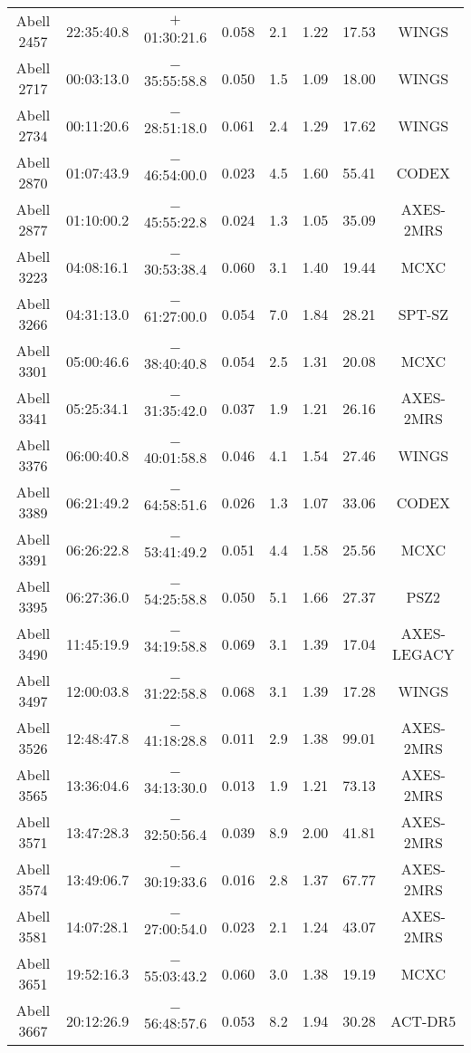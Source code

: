 \begin{table}
\begin{tabular}{cccccccc}
Abell 2457 & 22:35:40.8 & $+$01:30:21.6 & 0.058 & 2.1 & 1.22 & 17.53 & WINGS \\
Abell 2717 & 00:03:13.0 & $-$35:55:58.8 & 0.050 & 1.5 & 1.09 & 18.00 & WINGS \\
Abell 2734 & 00:11:20.6 & $-$28:51:18.0 & 0.061 & 2.4 & 1.29 & 17.62 & WINGS \\
Abell 2870 & 01:07:43.9 & $-$46:54:00.0 & 0.023 & 4.5 & 1.60 & 55.41 & CODEX \\
Abell 2877 & 01:10:00.2 & $-$45:55:22.8 & 0.024 & 1.3 & 1.05 & 35.09 & AXES-2MRS \\
Abell 3223 & 04:08:16.1 & $-$30:53:38.4 & 0.060 & 3.1 & 1.40 & 19.44 & MCXC \\
Abell 3266 & 04:31:13.0 & $-$61:27:00.0 & 0.054 & 7.0 & 1.84 & 28.21 & SPT-SZ \\
Abell 3301 & 05:00:46.6 & $-$38:40:40.8 & 0.054 & 2.5 & 1.31 & 20.08 & MCXC \\
Abell 3341 & 05:25:34.1 & $-$31:35:42.0 & 0.037 & 1.9 & 1.21 & 26.16 & AXES-2MRS \\
Abell 3376 & 06:00:40.8 & $-$40:01:58.8 & 0.046 & 4.1 & 1.54 & 27.46 & WINGS \\
Abell 3389 & 06:21:49.2 & $-$64:58:51.6 & 0.026 & 1.3 & 1.07 & 33.06 & CODEX \\
Abell 3391 & 06:26:22.8 & $-$53:41:49.2 & 0.051 & 4.4 & 1.58 & 25.56 & MCXC \\
Abell 3395 & 06:27:36.0 & $-$54:25:58.8 & 0.050 & 5.1 & 1.66 & 27.37 & PSZ2 \\
Abell 3490 & 11:45:19.9 & $-$34:19:58.8 & 0.069 & 3.1 & 1.39 & 17.04 & AXES-LEGACY \\
Abell 3497 & 12:00:03.8 & $-$31:22:58.8 & 0.068 & 3.1 & 1.39 & 17.28 & WINGS \\
Abell 3526 & 12:48:47.8 & $-$41:18:28.8 & 0.011 & 2.9 & 1.38 & 99.01 & AXES-2MRS \\
Abell 3565 & 13:36:04.6 & $-$34:13:30.0 & 0.013 & 1.9 & 1.21 & 73.13 & AXES-2MRS \\
Abell 3571 & 13:47:28.3 & $-$32:50:56.4 & 0.039 & 8.9 & 2.00 & 41.81 & AXES-2MRS \\
Abell 3574 & 13:49:06.7 & $-$30:19:33.6 & 0.016 & 2.8 & 1.37 & 67.77 & AXES-2MRS \\
Abell 3581 & 14:07:28.1 & $-$27:00:54.0 & 0.023 & 2.1 & 1.24 & 43.07 & AXES-2MRS \\
Abell 3651 & 19:52:16.3 & $-$55:03:43.2 & 0.060 & 3.0 & 1.38 & 19.19 & MCXC \\
Abell 3667 & 20:12:26.9 & $-$56:48:57.6 & 0.053 & 8.2 & 1.94 & 30.28 & ACT-DR5 \\

\end{tabular}
\end{table}
